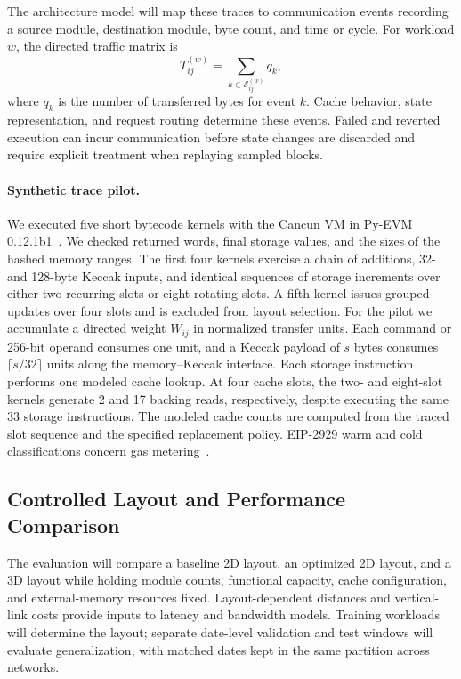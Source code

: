 \documentclass[runningheads]{llncs}
\begin{document}
The architecture model will map these traces to communication events recording a source module, destination module, byte count, and time or cycle. For workload $w$, the directed traffic matrix is
\begin{equation}
T_{ij}^{(w)}=\sum_{k\in\mathcal{E}_{ij}^{(w)}}q_k,
\end{equation}
where $q_k$ is the number of transferred bytes for event $k$. Cache behavior, state representation, and request routing determine these events. Failed and reverted execution can incur communication before state changes are discarded and require explicit treatment when replaying sampled blocks.

\paragraph{Synthetic trace pilot.} We executed five short bytecode kernels with the Cancun VM in Py-EVM 0.12.1b1~\cite{pyevm}. We checked returned words, final storage values, and the sizes of the hashed memory ranges. The first four kernels exercise a chain of additions, 32- and 128-byte Keccak inputs, and identical sequences of storage increments over either two recurring slots or eight rotating slots. A fifth kernel issues grouped updates over four slots and is excluded from layout selection. For the pilot we accumulate a directed weight $W_{ij}$ in normalized transfer units. Each command or 256-bit operand consumes one unit, and a Keccak payload of $s$ bytes consumes $\lceil s/32\rceil$ units along the memory--Keccak interface. Each storage instruction performs one modeled cache lookup. At four cache slots, the two- and eight-slot kernels generate 2 and 17 backing reads, respectively, despite executing the same 33 storage instructions. The modeled cache counts are computed from the traced slot sequence and the specified replacement policy. EIP-2929 warm and cold classifications concern gas metering~\cite{eip2929}.

\subsection{Controlled Layout and Performance Comparison}
The evaluation will compare a baseline 2D layout, an optimized 2D layout, and a 3D layout while holding module counts, functional capacity, cache configuration, and external-memory resources fixed. Layout-dependent distances and vertical-link costs provide inputs to latency and bandwidth models. Training workloads will determine the layout; separate date-level validation and test windows will evaluate generalization, with matched dates kept in the same partition across networks.
\end{document}
